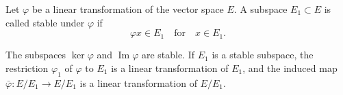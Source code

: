 Let $\varphi$ be a linear transformation of the vector space $E$. A subspace $E_1 \subset E$ is called stable under $\varphi$ if
$$\varphi x \in E_1 \quad \text{for} \quad x \in E_1.$$

The subspaces $\ker \varphi$ and $\operatorname{Im} \varphi$ are stable. If $E_1$ is a stable subspace, the restriction $\varphi_1$ of $\varphi$ to $E_1$ is a linear transformation of $E_1$, and the induced map $\bar{\varphi}: E/E_1 \to E/E_1$ is a linear transformation of $E/E_1$.
